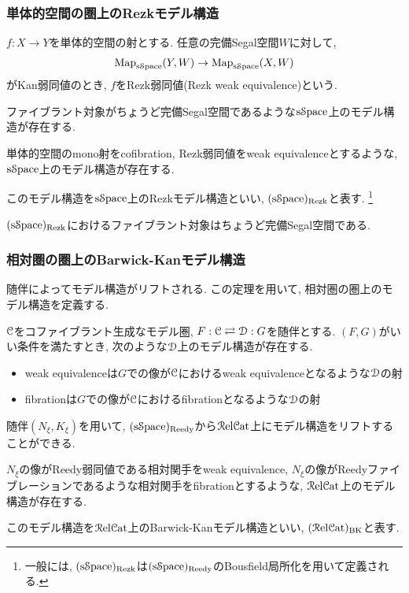 \documentclass[aspectratio=169, dvipdfmx, 8pt, notheorems, uplatex]{beamer}
\begin{document}
\begin{frame}
  \frametitle{単体的空間の圏上のRezkモデル構造}

  \begin{definition}[Rezk弱同値]
    $f : X \to Y$を単体的空間の射とする. 
    任意の完備Segal空間$W$に対して, 
    \begin{align*}
      \mathrm{Map}_{\mathrm{s}\mathcal{S}\mathrm{pace}}(Y,W) \to \mathrm{Map}_{\mathrm{s}\mathcal{S}\mathrm{pace}}(X,W)
    \end{align*}
    がKan弱同値のとき, $f$をRezk弱同値(Rezk weak equivalence)という. 
  \end{definition}

  ファイブラント対象がちょうど完備Segal空間であるような$\mathrm{s}\mathcal{S}\mathrm{pace}$上のモデル構造が存在する. 

  \begin{theorem}[Rezkモデル構造]
    単体的空間のmono射をcofibration, Rezk弱同値をweak equivalenceとするような, $\mathrm{s}\mathcal{S}\mathrm{pace}$上のモデル構造が存在する. 

    このモデル構造を$\mathrm{s}\mathcal{S}\mathrm{pace}$上のRezkモデル構造といい, $(\mathrm{s}\mathcal{S}\mathrm{pace})_{\mathrm{Rezk}}$と表す. 
    \footnote{
      一般には, $(\mathrm{s}\mathcal{S}\mathrm{pace})_{\mathrm{Rezk}}$は$(\mathrm{s}\mathcal{S}\mathrm{pace})_{\mathrm{Reedy}}$のBousfield局所化を用いて定義される. 
    }
  \end{theorem}

  \begin{theorem}
    $(\mathrm{s}\mathcal{S}\mathrm{pace})_{\mathrm{Rezk}}$におけるファイブラント対象はちょうど完備Segal空間である. 
  \end{theorem}

\end{frame}

\begin{frame}
  \frametitle{相対圏の圏上のBarwick-Kanモデル構造}

  随伴によってモデル構造がリフトされる. 
  この定理を用いて, 相対圏の圏上のモデル構造を定義する. 

  \begin{theorem}
    $\mathcal{C}$をコファイブラント生成なモデル圏, $F: \mathcal{C} \rightleftarrows \mathcal{D} : G$を随伴とする. 
    $(F,G)$がいい条件を満たすとき, 次のような$\mathcal{D}$上のモデル構造が存在する. 
    \begin{itemize}
      \item weak equivalenceは$G$での像が$\mathcal{C}$におけるweak equivalenceとなるような$\mathcal{D}$の射
      \item fibrationは$G$での像が$\mathcal{C}$におけるfibrationとなるような$\mathcal{D}$の射
    \end{itemize}
  \end{theorem}

  随伴$(N_\xi,K_\xi)$を用いて, $(\mathrm{s}\mathcal{S}\mathrm{pace})_{\mathrm{Reedy}}$から$\mathcal{R}\mathrm{el}\mathcal{C}\mathrm{at}$上にモデル構造をリフトすることができる. 

  \begin{theorem}
    $N_\xi$の像がReedy弱同値である相対関手をweak equivalence, $N_\xi$の像がReedyファイブレーションであるような相対関手をfibrationとするような, $\mathcal{R}\mathrm{el}\mathcal{C}\mathrm{at}$上のモデル構造が存在する. 

    このモデル構造を$\mathcal{R}\mathrm{el}\mathcal{C}\mathrm{at}$上のBarwick-Kanモデル構造といい, $(\mathcal{R}\mathrm{el}\mathcal{C}\mathrm{at})_{\mathrm{BK}}$と表す. 
  \end{theorem}

\end{frame}
\end{document}
